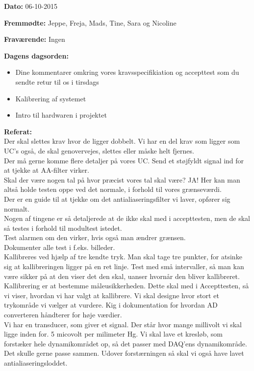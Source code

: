 \textbf{Dato:} 06-10-2015

\textbf{Fremmødte:} Jeppe, Freja, Mads, Tine, Sara og Nicoline

\textbf{Fraværende:} Ingen

\textbf{Dagens dagsorden:}
\begin{itemize}
	\item Dine kommentarer omkring vores kravsspecifikiation og accepttest som du sendte retur til os i tirsdags
	\item Kalibrering af systemet
    \item Intro til hardwaren i projektet\\
\end{itemize}

\textbf{Referat:}
\\Der skal slettes krav hvor de ligger dobbelt. Vi har en del krav som ligger som UC's også, de skal genovervejes, slettes eller måske helt fjernes. 
\\Der må gerne komme flere detaljer på vores UC. Send et støjfyldt signal ind for at tjekke at AA-filter virker. 
\\Skal der være nogen tal på hvor præcist vores tal skal være? JA! Her kan man altså holde testen oppe ved det normale, i forhold til vores grænseværdi. 
\\Der er en guide til at tjekke om det antialiaseringsfilter vi laver, opfører sig normalt. 
\\Nogen af tingene er så detaljerede at de ikke skal med i accepttesten, men de skal så testes i forhold til modultest istedet. 
\\Test alarmen om den virker, hvis også man ændrer grænsen. 
\\Dokumenter alle test i f.eks. billeder. 
\\Kallibreres ved hjælp af tre kendte tryk. Man skal tage tre punkter, for atsinke sig at kallibreringen ligger på en ret linje. Test med små intervaller, så man kan være sikker på at den viser det den skal, uanser hvornår den bliver kallibreret. Kallibrering er at bestemme måleusikkerheden. Dette skal med i Accepttesten, så vi viser, hvordan vi har valgt at kallibrere. Vi skal designe hvor stort et trykområde vi vælger at vurdere. Kig i dokumentation for hvordan AD converteren håndterer for høje værdier. 
\\Vi har en transducer, som giver et signal. Der står hvor mange millivolt vi skal ligge inden for. 5 micovolt per milimeter Hg. Vi skal lave et kresløb, som forstæker hele dynamikområdet op, så det passer med DAQ'ens dynamikområde. Det skulle gerne passe sammen. Udover forstærningen så skal vi også have lavet antialiaseringsloddet.